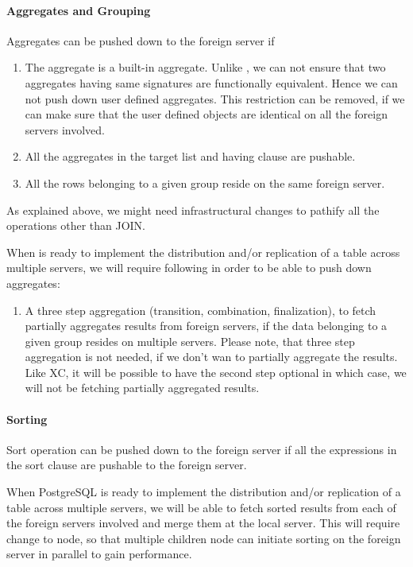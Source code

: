 \paragraph{Aggregates and Grouping}

	Aggregates can be pushed down to the foreign server if

	\begin{enumerate}
		\item The aggregate is a built-in aggregate.
			  Unlike \XC, we can not ensure that two aggregates having same signatures are
			  functionally equivalent.
			  Hence we can not push down user defined aggregates.
			  This restriction can be removed, if we can make sure that the user defined
			  objects are identical on all the foreign servers involved.
		\item All the aggregates in the target list and having clause are pushable.
		\item All the rows belonging to a given group reside on the same foreign server.
	\end{enumerate}

	As explained above, we might need infrastructural changes to pathify all the operations
	other than JOIN.

	When \PG{} is ready to implement the distribution and/or replication of a table across
	multiple servers, we will require following in order to be able to push down aggregates:

	\begin{enumerate}
		\item A three step aggregation (transition, combination, finalization), to fetch
			  partially aggregates results from foreign servers, if the data belonging
			  to a given group resides on multiple servers.
			  Please note, that three step aggregation is not needed, if we don’t wan
			  to partially aggregate the results. Like XC, it will be possible to have
			  the second step optional in which case, we will not be fetching partially
			  aggregated results.
	\end{enumerate}

\paragraph{Sorting}

	Sort operation can be pushed down to the foreign server if all the expressions in the sort
	clause are pushable to the foreign server.

	When PostgreSQL is ready to implement the distribution and/or replication of a table
	across multiple servers, we will be able to fetch sorted results from each of the foreign
	servers involved and merge them at the local server. This will require change to
	 node, so that multiple children node can initiate sorting on
	the foreign server in parallel to gain performance.

